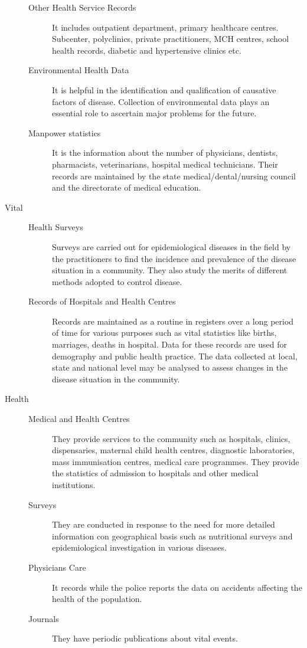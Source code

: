 \documentclass[
10pt, %
a4paper, %
]{report}
\begin{document}
\begin{description}
\begin{description}
\item[Other Health Service Records] It includes outpatient department, primary healthcare centres. Subcenter, polyclinics, private practitioners, MCH centres, school health records, diabetic and hypertensive clinics etc.
\item[Environmental Health Data] It is helpful in the identification and qualification of causative factors of disease. Collection of environmental data plays an essential role to ascertain major problems for the future.
\item[Manpower statistics] It is the information about the number of physicians, dentists, pharmacists, veterinarians, hospital medical technicians. Their records are maintained by the state medical/dental/nursing council and the directorate of medical education.
\end{description}
\item[Vital]
\begin{description}
\item[]
\item[Health Surveys] Surveys are carried out for epidemiological diseases in the field by the practitioners to find the incidence and prevalence of the disease situation in a community. They also study the merits of different methods adopted to control disease.
\item[Records of Hospitals and Health Centres] Records are maintained as a routine in registers over a long period of time for various purposes such as vital statistics like births, marriages, deaths in hospital. Data for these records are used for demography and public health practice. The data collected at local, state and national level may be analysed to assess changes in the disease situation in the community.
\end{description}
\item[Health]
\begin{description}
\item[]
\item[Medical and Health Centres] They provide services to the community such as hospitals, clinics, dispensaries, maternal child health centres, diagnostic laboratories, mass immunisation centres, medical care programmes. They provide the statistics of admission to hospitals and other medical institutions.
\item[Surveys] They are conducted in response to the need for more detailed information con geographical basis such as nutritional surveys and epidemiological investigation in various diseases.
\item[Physicians Care] It records while the police reports the data on accidents affecting the health of the population.
\item[Journals] They have periodic publications about vital events.
\end{description}
\end{description}
\end{document}
